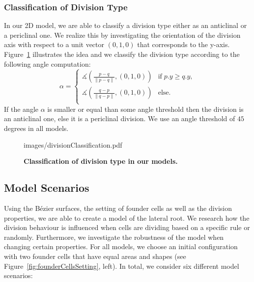 \documentclass[11pt,a4paper, final]{article}
\begin{document}
\subsubsection{Classification of Division Type}
\label{sec:ClassificationOfDivisions}
\noindent
In our 2D model, we are able to classify a division type either as an anticlinal or a periclinal one. We realize this by investigating the orientation of the division axis with respect to a unit vector $(0,1,0)$ that corresponds to the y-axis. Figure~\ref{fig:divisionClassification} illustrates the idea and we classify the division type according to the following angle computation:
\begin{equation}
\alpha =
\begin{cases}
\measuredangle \left( \frac{p-q}{\lVert p-q \rVert}, (0,1,0) \right) & \text{if}\; p.y \geq q.y,\\
\measuredangle \left( \frac{q-p}{\lVert q-p \rVert}, (0,1,0) \right) & \text{else}.\\
\end{cases}
\end{equation}
If the angle $\alpha$ is smaller or equal than some angle threshold then the division is an anticlinal one, else it is a periclinal division. We use an angle threshold of $45$ degrees in all models.

%
\begin{figure}[htbp]
	\begin{center}
		\begin{overpic}[width=0.5\linewidth]{images/divisionClassification.pdf}
		\end{overpic}
\caption[]
{
{\bf Classification of division type in our models.}
}
	\label{fig:divisionClassification}
	\end{center}
\end{figure}
%

\subsection{Model Scenarios}
\label{sec:modelScenarios}
\noindent
Using the B\'ezier surfaces, the setting of founder cells as well as the division properties, we are able to create a model of the lateral root. We research how the division behaviour is influenced when cells are dividing based on a specific rule or randomly. Furthermore, we investigate the robustness of the model when changing certain properties. For all models, we choose an initial configuration with two founder cells that have equal areas and shapes (see Figure~\ref{fig:founderCellsSetting}, left). In total, we consider six different model scenarios:
\end{document}
